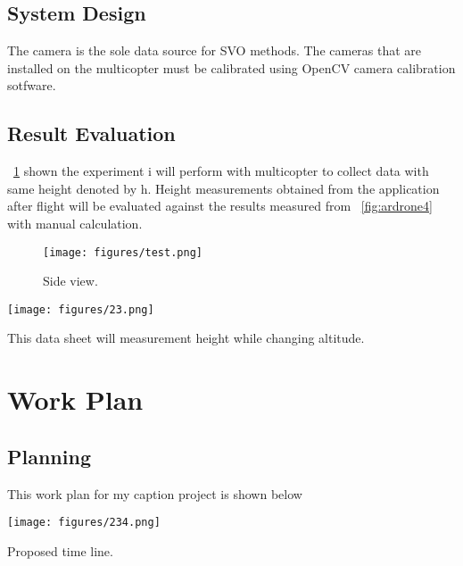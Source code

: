 \documentclass[12pt, a4paper]{aitthesis}
\begin{document}
\section{System Design}
The camera is the sole data source for SVO methods. The cameras that are installed on the multicopter must be calibrated using OpenCV camera calibration sotfware. 

\section{Result Evaluation }

\figurename~\ref{fig:ardrone3} shown the experiment i will perform with multicopter to collect data with same height denoted by h. Height measurements obtained from the application after flight will be evaluated against the results measured from \tablename~\ref{fig:ardrone4} with manual calculation.
 
\begin{figure}[h]
\begin{center}
	\texttt{[image: figures/test.png]}
	\caption[Side view]{Side view.} \label{fig:ardrone3}
\end{center}
\end{figure}




\FloatBarrier
 \begin{table}[t]
\begin{center}
	\texttt{[image: figures/23.png]}
	\caption[Data sheet]{This data sheet will measurement height while changing altitude.} \label{fig:ardrone4}
\end{center}
\end{table}
\FloatBarrier



%
\chapter{Work Plan} \label{planning}


\section{Planning}
This work plan for my caption project is shown below


\begin{table}[h]
\begin{center}
	\texttt{[image: figures/234.png]}
	\caption[Proposed time line]{Proposed time line.} \label{fig:timeline}
\end{center}
\end{table}
\end{document}
